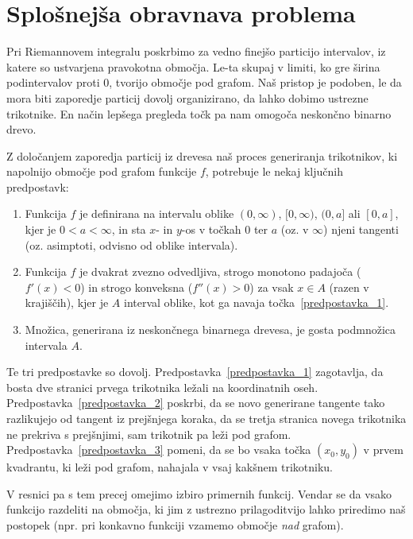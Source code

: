 \documentclass[a4paper, 12pt, titlepage]{article}
\begin{document}
\section{Splošnejša obravnava problema}

Pri Riemannovem integralu poskrbimo za vedno finejšo particijo intervalov, iz katere so ustvarjena pravokotna območja. Le-ta skupaj v limiti, ko gre širina podintervalov proti 0, tvorijo območje pod grafom. Naš pristop je podoben, le da mora biti zaporedje particij dovolj organizirano, da lahko dobimo ustrezne trikotnike. En način lepšega pregleda točk pa nam omogoča neskončno binarno drevo.

Z določanjem zaporedja particij iz drevesa naš proces generiranja trikotnikov, ki napolnijo območje pod grafom funkcije $ f $, potrebuje le nekaj ključnih predpostavk:

\begin{enumerate}
    \item \label{predpostavka_1} Funkcija $ f $ je definirana na intervalu oblike $(0, \infty)$, $[0,\infty)$, $(0,a]$ ali $[0,a]$, kjer je $ 0 < a < \infty $, in sta $x$- in $y$-os v točkah 0 ter $a$ (oz. v $ \infty $) njeni tangenti (oz. asimptoti, odvisno od oblike intervala).
    \item \label{predpostavka_2} Funkcija $ f $ je dvakrat zvezno odvedljiva, strogo monotono padajoča ($ f'(x) < 0 $) in strogo konveksna ($ f''(x) > 0 $) za vsak $ x \in A$ (razen v krajiščih), kjer je $ A $ interval oblike, kot ga navaja točka~\ref{predpostavka_1}.
    \item \label{predpostavka_3} Množica, generirana iz neskončnega binarnega drevesa, je gosta podmnožica intervala $ A $.
\end{enumerate}

Te tri predpostavke so dovolj. Predpostavka~\ref{predpostavka_1} zagotavlja, da bosta dve stranici prvega trikotnika ležali na koordinatnih oseh. Predpostavka~\ref{predpostavka_2} poskrbi, da se novo generirane tangente tako razlikujejo od tangent iz prejšnjega koraka, da se tretja stranica novega trikotnika ne prekriva s prejšnjimi, sam trikotnik pa leži pod grafom. Predpostavka~\ref{predpostavka_3} pomeni, da se bo vsaka točka $ (x_0, y_0) $ v prvem kvadrantu, ki leži pod grafom, nahajala v vsaj kakšnem trikotniku.

V resnici pa s tem precej omejimo izbiro primernih funkcij. Vendar se da vsako funkcijo razdeliti na območja, ki jim z ustrezno prilagoditvijo lahko priredimo naš postopek (npr. pri konkavno funkciji vzamemo območje \emph{nad} grafom).
\end{document}
